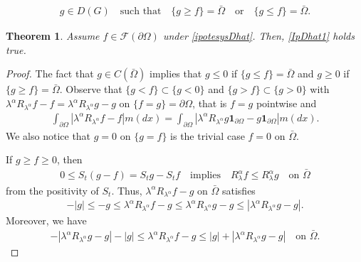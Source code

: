 \documentclass[11pt,a4paper]{article}
\newtheorem{theorem}{Theorem}[section]
\begin{document}
\begin{align}
g \in D(G) \quad \textrm{such that} \quad \{g\geq f\} = \bar{\Omega} \quad \textrm{or} \quad \{g \leq f\} = \bar{\Omega}.
\label{ipotesysDhat}
\end{align}
\begin{theorem}
Assume $f \in \mathcal{F}(\partial \Omega)$ under \eqref{ipotesysDhat}. Then, \eqref{IpDhat1} holds true.
\end{theorem}
\begin{proof}


The fact that $g \in C(\bar{\Omega})$ implies that $g\leq 0$ if $\{g \leq f\} = \bar{\Omega}$ and $g\geq 0$ if $\{g\geq f\}=\bar{\Omega}$. Observe that $\{g < f\} \subset \{g < 0 \}$ and $\{g > f \} \subset \{g > 0 \}$ with $\lambda^\alpha R_{\lambda^\alpha} f - f = \lambda^\alpha R_{\lambda^\alpha} g - g$ on $\{f=g\} = \partial \Omega$, that is $f=g$ pointwise and
\begin{align*}
\int_{\partial \Omega} | \lambda^\alpha R_{\lambda^\alpha} f - f | m(dx) = \int_{\partial \Omega} | \lambda^\alpha R_{\lambda^\alpha} g \mathbf{1}_{\partial \Omega} - g \mathbf{1}_{\partial \Omega} | m(dx).
\end{align*}
We also notice that $g=0$ on $\{g=f\}$ is the trivial case $f=0$ on $\bar{\Omega}$. 

If $g\geq f \geq 0$, then
\begin{align*}
0 \leq S_t (g-f) = S_t g - S_t f \quad \textrm{implies} \quad R^\alpha_\lambda f \leq R^\alpha_\lambda g \quad \textrm{on } \bar{\Omega}
\end{align*}
from the positivity of $S_t$. Thus, $\lambda^\alpha R_{\lambda^\alpha} f - g$ on $\bar{\Omega}$ satisfies 
\begin{align*}
- |g| \leq -g \leq \lambda^\alpha R_{\lambda^\alpha} f - g \leq \lambda^\alpha R_{\lambda^\alpha} g - g \leq | \lambda^\alpha R_{\lambda^\alpha} g - g |.
\end{align*}
Moreover, we have
\begin{align*}
- | \lambda^\alpha R_{\lambda^\alpha} g - g | - |g| \leq \lambda^\alpha R_{\lambda^\alpha} f - g \leq |g| + | \lambda^\alpha R_{\lambda^\alpha} g - g |  \quad \textrm{on } \bar{\Omega}. 
\end{align*}


\end{proof}
\end{document}
